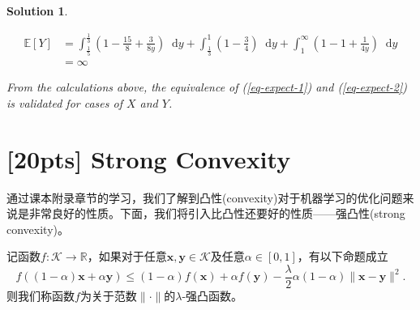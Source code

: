 \documentclass[a4paper,UTF8]{article}
\numberwithin{equation}{section}
\newtheorem*{mySol}{Solution}
\newcommand*\diff{\mathop{}\!\mathrm{d}}
\begin{document}
\begin{mySol}
\begin{enumerate}[{(}1{)}]
\begin{enumerate}[(i)]
\begin{itemize}
\begin{equation*}
\begin{split}
\mathbb{E}[Y]&=\int_\frac{1}{5}^\frac{1}{3} (1-\frac{15}{8} + \frac{3}{8y})  \diff y +\int_\frac{1}{3}^1 (1-\frac{3}{4}) \diff y + \int_1^\infty (1-1+\frac{1}{4y}) \diff y \\
&=\infty
\end{split}
\end{equation*}
\end{itemize}

From the calculations above, the equivalence of (\ref{eq-expect-1}) and (\ref{eq-expect-2}) is validated for cases of $X$ and $Y$.
\end{enumerate}

\end{enumerate}

\end{mySol}

\newpage

\section{[20pts] Strong Convexity}
通过课本附录章节的学习，我们了解到凸性(convexity)对于机器学习的优化问题来说是非常良好的性质。下面，我们将引入比凸性还要好的性质——强凸性(strong convexity)。
\begin{def-box}[强凸性]
记函数$f: \mathcal{K} \rightarrow \mathbb{R}$，如果对于任意$\mathbf{x}, \mathbf{y} \in \mathcal{K}$及任意$\alpha\in[0,1]$，有以下命题成立
\begin{equation}
  \label{eq-sc-1}
  f((1-\alpha)\mathbf{x} + \alpha\mathbf{y})\leq (1-\alpha)f(\mathbf{x}) + \alpha f(\mathbf{y}) - \frac{\lambda}{2}\alpha(1-\alpha)\lVert \mathbf{x} - \mathbf{y}\rVert^2.
\end{equation}
则我们称函数$f$为关于范数$\lVert \cdot \rVert$的$\lambda$-强凸函数。
\end{def-box}
\end{document}
